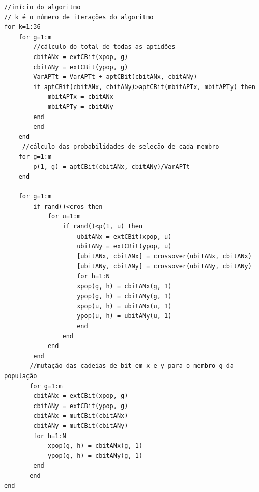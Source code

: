 \begin{verbatim}
//início do algoritmo
// k é o número de iterações do algoritmo
for k=1:36
    for g=1:m
        //cálculo do total de todas as aptidões
        cbitANx = extCBit(xpop, g)
        cbitANy = extCBit(ypop, g)
        VarAPTt = VarAPTt + aptCBit(cbitANx, cbitANy)
        if aptCBit(cbitANx, cbitANy)>aptCBit(mbitAPTx, mbitAPTy) then
            mbitAPTx = cbitANx
            mbitAPTy = cbitANy
        end
        end
    end
     //cálculo das probabilidades de seleção de cada membro
    for g=1:m
        p(1, g) = aptCBit(cbitANx, cbitANy)/VarAPTt
    end
    
    for g=1:m
        if rand()<cros then
            for u=1:m
                if rand()<p(1, u) then
                    ubitANx = extCBit(xpop, u)
                    ubitANy = extCBit(ypop, u)
                    [ubitANx, cbitANx] = crossover(ubitANx, cbitANx)
                    [ubitANy, cbitANy] = crossover(ubitANy, cbitANy)
                    for h=1:N
                    xpop(g, h) = cbitANx(g, 1)
                    ypop(g, h) = cbitANy(g, 1)
                    xpop(u, h) = ubitANx(u, 1)
                    ypop(u, h) = ubitANy(u, 1)                   
                    end
                end
            end
        end
       //mutação das cadeias de bit em x e y para o membro g da população
       for g=1:m
        cbitANx = extCBit(xpop, g)
        cbitANy = extCBit(ypop, g)
        cbitANx = mutCBit(cbitANx)
        cbitANy = mutCBit(cbitANy)
        for h=1:N
            xpop(g, h) = cbitANx(g, 1)
            ypop(g, h) = cbitANy(g, 1)
        end    
       end
end
\end{verbatim}
